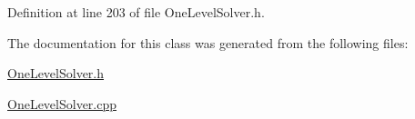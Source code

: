 Definition at line 203 of file One\+Level\+Solver.\+h.



The documentation for this class was generated from the following files\+:\begin{DoxyCompactItemize}
\item 
\hyperlink{OneLevelSolver_8h}{One\+Level\+Solver.\+h}\item 
\hyperlink{OneLevelSolver_8cpp}{One\+Level\+Solver.\+cpp}\end{DoxyCompactItemize}
